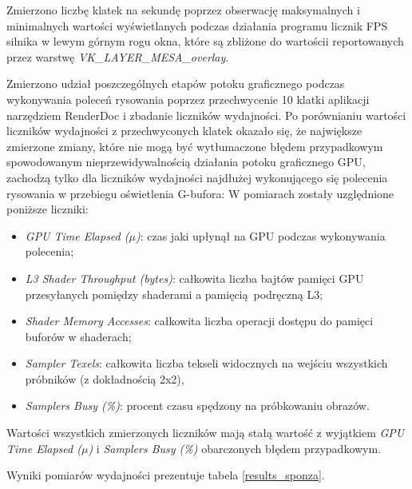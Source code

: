 Zmierzono liczbę klatek na sekundę poprzez obserwację maksymalnych i minimalnych wartości wyświetlanych podczas działania programu licznik FPS silnika w lewym górnym rogu okna, które są zbliżone do wartościi reportowanych przez warstwę \textit{VK\_LAYER\_MESA\_overlay}.

Zmierzono udział poszczególnych etapów potoku graficznego podczas wykonywania poleceń rysowania poprzez przechwycenie 10 klatki aplikacji narzędziem RenderDoc i zbadanie liczników wydajności.
Po porównianiu wartości liczników wydajności z przechwyconych klatek okazało się, że największe zmierzone zmiany, które nie mogą być wytłumaczone błędem przypadkowym spowodowanym nieprzewidywalnością działania potoku graficznego GPU, zachodzą tylko dla liczników wydajności najdłużej wykonującego się polecenia rysowania w przebiegu oświetlenia G-bufora:
W pomiarach zostały uzględnione poniższe liczniki:
\begin{itemize}
	\item \textit{GPU Time Elapsed ($\mu$)}: czas jaki upłynął na GPU podczas wykonywania polecenia;
	\item \textit{L3 Shader Throughput (bytes)}: całkowita liczba bajtów pamięci GPU przesyłanych pomiędzy shaderami a pamięcią podręczną L3;
	\item \textit{Shader Memory Accesses}: całkowita liczba operacji dostępu do pamięci buforów w shaderach;
	\item \textit{Sampler Texels}: całkowita liczba tekseli widocznych na wejściu wszystkich próbników (z dokładnością 2x2),
	\item \textit{Samplers Busy (\%)}: procent czasu spędzony na próbkowaniu obrazów.
\end{itemize}
Wartości wszystkich zmierzonych liczników mają stałą wartość z wyjątkiem \textit{GPU Time Elapsed ($\mu$)} i \textit{Samplers Busy (\%)} obarczonych błędem przypadkowym.

Wyniki pomiarów wydajności prezentuje tabela \ref{results_sponza}.


